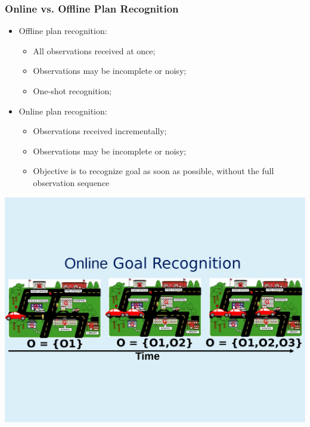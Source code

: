 \documentclass{beamer}
\begin{document}
	\begin{frame}[c]\frametitle{Online vs. Offline Plan Recognition}
		\begin{itemize}
			\item Offline plan recognition:
			\begin{itemize}
				\item All observations received at once;
				\item Observations may be incomplete or noisy;
				\item One-shot recognition;
			\end{itemize}
			\item Online plan recognition:
			\begin{itemize}
				\item Observations received incrementally;
                \item Observations may be incomplete or noisy; %
				\item Objective is to recognize goal as soon as possible, without the full observation sequence
			\end{itemize}
		\end{itemize}
		\begin{center}
			\vspace{-3mm}
			\includegraphics[width=.9\textwidth]{fig/observations-example.pdf}
		\end{center}
	\end{frame}
	
\end{document}
